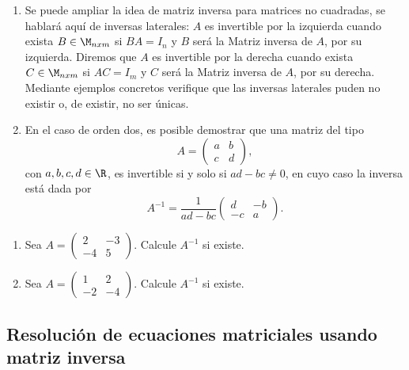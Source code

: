 \begin{rmk}
\begin{enumerate}
    \item Se puede ampliar la idea de matriz inversa para matrices no cuadradas, se
hablará aquí de inversas laterales: $A$ es invertible por la izquierda cuando exista $B \in
\M_{n x m}$ si $BA = I_n$ y $B$ será la Matriz inversa de $A$, por su izquierda. Diremos que $A$ es invertible por la derecha cuando exista $C \in
\M_{n x m}$ si $AC = I_m$ y $C$ será la Matriz inversa de $A$, por su derecha.
Mediante ejemplos concretos verifique que las inversas laterales puden no existir
o, de existir, no ser únicas.


\item En el caso de orden dos, es posible demostrar que una matriz del tipo
\[A=\begin{pmatrix}  a & b \\ c & d \end{pmatrix},\]
con $a, b,c,d \in \R$, es invertible si y solo si $ad-bc\neq 0$, en cuyo caso la inversa est\'a dada por
\[A^{-1}=\frac{1}{ad-bc}\begin{pmatrix}  d & -b \\ -c & a \end{pmatrix}.\]
\end{enumerate}
\end{rmk}

\begin{ejer}
\begin{enumerate}
\item
Sea $A = \begin{pmatrix}  2 & -3 \\ -4 & 5 \end{pmatrix}$. Calcule $A^{-1}$ si existe.

\item
Sea $A = \begin{pmatrix}  1 & 2 \\ -2 & -4 \end{pmatrix}$. Calcule $A^{-1}$ si existe.
\end{enumerate}
\end{ejer}
\vspace*{2cm}
\subsection{Resoluci\'on de ecuaciones matriciales usando matriz inversa}

